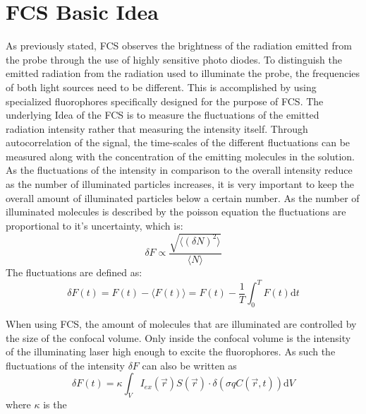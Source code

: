 \section{FCS Basic Idea}
As previously stated, FCS observes the brightness of the radiation emitted from the probe
through the use of highly sensitive photo diodes. To distinguish the emitted radiation from the radiation used to illuminate the probe, the
frequencies of both light sources need to be different. This is accomplished by using specialized fluorophores specifically designed for the purpose
of FCS.
The underlying Idea of the FCS is to measure the fluctuations of the emitted radiation intensity rather that measuring the intensity itself. Through
autocorrelation of the signal, the time-scales of the different fluctuations can be measured along with the concentration of the emitting molecules in
the solution.
As the fluctuations of the intensity in comparison to the overall intensity reduce as the number of illuminated particles increases, it is very
important to keep the overall amount of illuminated particles below a certain number. As the number of illuminated molecules is described by the
poisson equation the fluctuations are proportional to it's uncertainty, which is:
\begin{equation}
	\delta F \propto \frac{\sqrt{\langle(\delta N)^2\rangle}}{\langle N\rangle}
	\label{eq:poisson_uncertainty}
\end{equation}
The fluctuations are defined as:
\begin{equation}
	\delta F(t) = F(t) - \langle F (t) \rangle = F(t) - \frac{1}{T}\int_0^TF(t)\text{d}t
	\label{eq:fluctuations}
\end{equation}

When using FCS, the amount of molecules that are illuminated are controlled by the size of the confocal volume. Only inside the confocal volume is the intensity of the illuminating
laser high enough to excite the fluorophores. As such the fluctuations of the intensity $\delta F$ can also be written as
\begin{equation}
	\delta F(t) = \kappa \int_V I_{ex}(\vec{r})S(\vec{r})\cdot \delta(\sigma q C(\vec{r},t))\text{d}V
	\label{eq:specail_fluctuations}
\end{equation}
where $\kappa$ is the 
